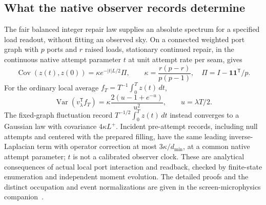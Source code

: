 \subsection{What the native observer records determine}
\label{subsec:native-cosmology-source-boundary}
The fair balanced integer repair law supplies an absolute spectrum for a
specified load readout, without fitting an observed sky. On a connected
weighted port graph with \(p\) ports and \(r\) raised loads, stationary
continued repair, in the continuous native attempt parameter \(t\) at unit
attempt rate per seam, gives
\[
 \operatorname{Cov}(z(t),z(0))=\kappa e^{-|t|L/2}\Pi,\qquad
 \kappa=\frac{r(p-r)}{p(p-1)},\quad
 \Pi=I-\mathbf1\mathbf1^{\mathsf T}/p.
\]
For the ordinary local average \(f_T=T^{-1}\int_0^Tz(t)\,dt\),
\[
 \operatorname{Var}(v_\lambda^{\mathsf T}f_T)
 =\kappa\frac{2(u-1+e^{-u})}{u^2},\qquad u=\lambda T/2.
\]
The fixed-graph fluctuation record
\(T^{-1/2}\int_0^Tz(t)\,dt\) instead converges to a Gaussian law with
covariance \(4\kappa L^+\). Incident pre-attempt records, including null
attempts and centered with the prepared filling, have the same leading
inverse-Laplacian term with operator correction at most
\(3\kappa/d_{\min}\), at a common native attempt parameter; \(t\) is not a
calibrated observer clock. These are
analytical consequences of actual local port interaction and readback,
checked by finite-state enumeration and independent moment evolution.
The detailed proofs and the distinct occupation and event normalizations
are given in the screen-microphysics companion~\cite{ophmicro}.

